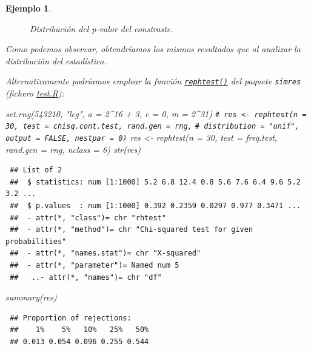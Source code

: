 \documentclass[
  10pt,
]{book}
\newenvironment{Shaded}{\begin{snugshade}}{\end{snugshade}}
\newcommand{\AttributeTok}[1]{\textcolor[rgb]{0.77,0.63,0.00}{#1}}
\newcommand{\CommentTok}[1]{\textcolor[rgb]{0.56,0.35,0.01}{\textit{#1}}}
\newcommand{\DecValTok}[1]{\textcolor[rgb]{0.00,0.00,0.81}{#1}}
\newcommand{\FunctionTok}[1]{\textcolor[rgb]{0.00,0.00,0.00}{#1}}
\newcommand{\NormalTok}[1]{#1}
\newcommand{\OtherTok}[1]{\textcolor[rgb]{0.56,0.35,0.01}{#1}}
\newcommand{\SpecialCharTok}[1]{\textcolor[rgb]{0.00,0.00,0.00}{#1}}
\newcommand{\StringTok}[1]{\textcolor[rgb]{0.31,0.60,0.02}{#1}}
\theoremstyle{break}
\newtheorem{example}{Ejemplo}[chapter]
\theoremstyle{nonumberplain}
\renewcommand{\CommentTok}[1]{\textcolor[rgb]{0.41,0.41,0.41}{\texttt{#1}}}
\begin{document}
\begin{example}
\begin{figure}[!htbp]
{}

\caption{Distribución del p-valor del constraste.}\label{fig:rep-test-pval}
\end{figure}

Como podemos observar, obtendríamos los mismos resultados que al analizar la distribución del estadístico.

Alternativamente podríamos emplear la función \href{https://rubenfcasal.github.io/simres/reference/rephtest.html}{\texttt{rephtest()}} del paquete \texttt{simres} (fichero \href{R/test.R}{\emph{test.R}}):

\begin{Shaded}
\begin{Highlighting}[]
\FunctionTok{set.rng}\NormalTok{(}\DecValTok{543210}\NormalTok{, }\StringTok{"lcg"}\NormalTok{, }\AttributeTok{a =} \DecValTok{2}\SpecialCharTok{\^{}}\DecValTok{16} \SpecialCharTok{+} \DecValTok{3}\NormalTok{, }\AttributeTok{c =} \DecValTok{0}\NormalTok{, }\AttributeTok{m =} \DecValTok{2}\SpecialCharTok{\^{}}\DecValTok{31}\NormalTok{)}
\CommentTok{\# res \textless{}{-} rephtest(n = 30, test = chisq.cont.test, rand.gen = rng,}
\CommentTok{\#          distribution = "unif", output = FALSE, nestpar = 0)}
\NormalTok{res }\OtherTok{\textless{}{-}} \FunctionTok{rephtest}\NormalTok{(}\AttributeTok{n =} \DecValTok{30}\NormalTok{, }\AttributeTok{test =}\NormalTok{ freq.test, }\AttributeTok{rand.gen =}\NormalTok{ rng, }\AttributeTok{nclass =} \DecValTok{6}\NormalTok{)}
\FunctionTok{str}\NormalTok{(res)}
\end{Highlighting}
\end{Shaded}

\begin{verbatim}
 ## List of 2
 ##  $ statistics: num [1:1000] 5.2 6.8 12.4 0.8 5.6 7.6 6.4 9.6 5.2 3.2 ...
 ##  $ p.values  : num [1:1000] 0.392 0.2359 0.0297 0.977 0.3471 ...
 ##  - attr(*, "class")= chr "rhtest"
 ##  - attr(*, "method")= chr "Chi-squared test for given probabilities"
 ##  - attr(*, "names.stat")= chr "X-squared"
 ##  - attr(*, "parameter")= Named num 5
 ##   ..- attr(*, "names")= chr "df"
\end{verbatim}

\begin{Shaded}
\begin{Highlighting}[]
\FunctionTok{summary}\NormalTok{(res)}
\end{Highlighting}
\end{Shaded}

\begin{verbatim}
 ## Proportion of rejections:
 ##    1%    5%   10%   25%   50% 
 ## 0.013 0.054 0.096 0.255 0.544
\end{verbatim}


\end{example}
\end{document}
